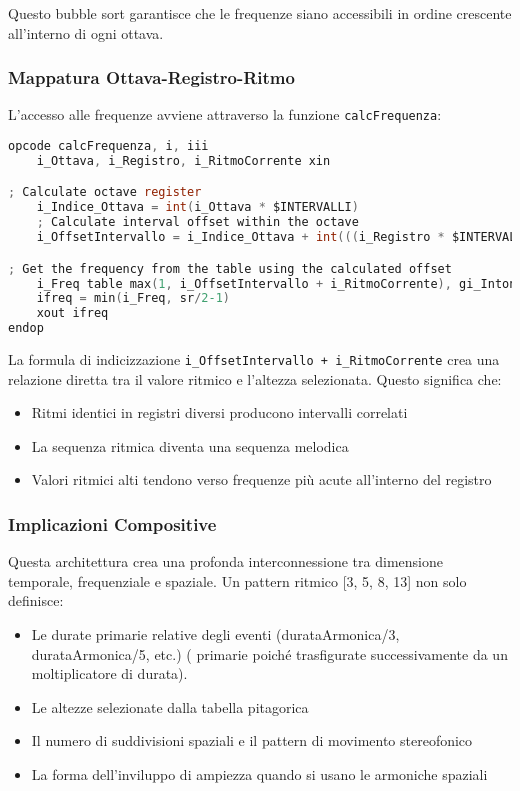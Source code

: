 Questo bubble sort garantisce che le frequenze siano accessibili in ordine crescente all'interno di ogni ottava.
\subsubsection{Mappatura Ottava-Registro-Ritmo}
L'accesso alle frequenze avviene attraverso la funzione \texttt{calcFrequenza}:

\begin{lstlisting}[language=C]
opcode calcFrequenza, i, iii
    i_Ottava, i_Registro, i_RitmoCorrente xin

; Calculate octave register
    i_Indice_Ottava = int(i_Ottava * $INTERVALLI)
    ; Calculate interval offset within the octave
    i_OffsetIntervallo = i_Indice_Ottava + int(((i_Registro * $INTERVALLI) / $REGISTRI))

; Get the frequency from the table using the calculated offset
    i_Freq table max(1, i_OffsetIntervallo + i_RitmoCorrente), gi_Intonazione
    ifreq = min(i_Freq, sr/2-1)
    xout ifreq
endop
\end{lstlisting}

La formula di indicizzazione \texttt{i\_OffsetIntervallo + i\_RitmoCorrente} crea una relazione diretta tra il valore ritmico e l'altezza selezionata. Questo significa che:

\begin{itemize}
    \item Ritmi identici in registri diversi producono intervalli correlati
    \item La sequenza ritmica diventa una sequenza melodica
    \item Valori ritmici alti tendono verso frequenze più acute all'interno del registro
\end{itemize}
\subsubsection{Implicazioni Compositive}
Questa architettura crea una profonda interconnessione tra dimensione temporale, frequenziale e spaziale. Un pattern ritmico [3, 5, 8, 13] non solo definisce:
\begin{itemize}
    \item Le durate primarie relative degli eventi (durataArmonica/3, durataArmonica/5, etc.) ( primarie poiché trasfigurate successivamente da un moltiplicatore di durata).
    \item Le altezze selezionate dalla tabella pitagorica
    \item Il numero di suddivisioni spaziali e il pattern di movimento stereofonico
    \item La forma dell'inviluppo di ampiezza quando si usano le armoniche spaziali
\end{itemize}


